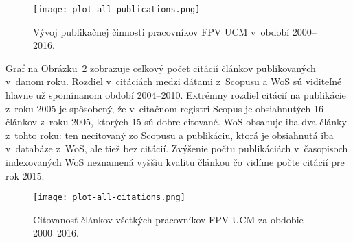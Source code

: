 \begin{figure}
  \centering
  \texttt{[image: plot-all-publications.png]}
  \caption{Vývoj publikačnej činnosti pracovníkov FPV UCM v~období 2000--2016.}
  \label{fig:plot.all.publications}
\end{figure}

Graf na Obrázku~\ref{fig:plot.all.citations} zobrazuje celkový počet citácií
článkov publikovaných v~danom roku.  Rozdiel v~citáciách medzi dátami z~Scopusu
a WoS sú viditeľné hlavne už spomínanom období 2004--2010.  Extrémny rozdiel
citácií na publikácie z~roku 2005 je spôsobený, že v~citačnom registri Scopus je
obsiahnutých 16 článkov z~roku 2005, ktorých 15 sú dobre citované.  WoS obsahuje
iba dva články z~tohto roku: ten necitovaný zo Scopusu a publikáciu, ktorá je
obsiahnutá iba v~databáze z~WoS, ale tiež bez citácií.  Zvýšenie počtu
publikáciách v~časopisoch indexovaných WoS neznamená vyššiu kvalitu článkou čo
vidíme počte citácií pre rok 2015.

\begin{figure}
  \centering
  \texttt{[image: plot-all-citations.png]}
  \caption{Citovanosť článkov všetkých pracovníkov FPV UCM za obdobie
    2000--2016.}
  \label{fig:plot.all.citations}
\end{figure}

